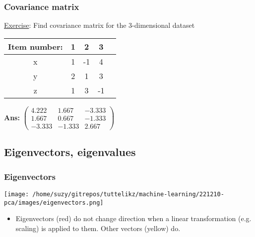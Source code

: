 \documentclass{beamer}
\begin{document}
    \begin{frame}
        \frametitle{Covariance matrix}        
        \underline{Exercise}:  Find covariance matrix for the 3-dimensional dataset
        \begin{center}
            \begin{tabular}{ |c|c|c|c|c| } 
            \hline
            Item number: & 1 & 2 & 3 \\
            \hline
            x & 1  & -1 & 4 \\ 
            y & 2  & 1 & 3 \\ 
            z & 1  & 3 & -1 \\ 
            \hline
            \end{tabular}
        \end{center}
        \textbf{Ans: } $\begin{pmatrix}
            4.222 & 1.667 & -3.333 \\
            1.667 & 0.667 & -1.333 \\
            -3.333 & -1.333 & 2.667
        \end{pmatrix}$
        \let\thefootnote\relax{}
        
\end{frame}


    \subsection{Eigenvectors, eigenvalues}
    \begin{frame}
        \frametitle{Eigenvectors}
        \begin{center}
            \texttt{[image: /home/suzy/gitrepos/tuttelikz/machine-learning/221210-pca/images/eigenvectors.png]}
        \end{center}
        \begin{itemize}
          \item Eigenvectors (red) do not change direction when a linear transformation (e.g. scaling) is applied to them. Other vectors (yellow) do.
        \end{itemize}
    \end{frame}
\end{document}
